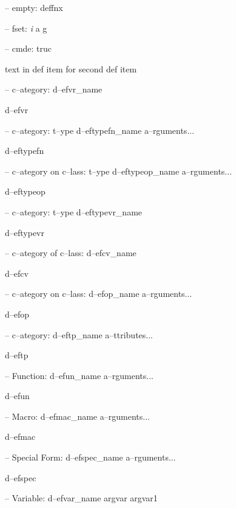 \documentclass{book}
\begin{document}
%
\hbox{}-- empty: deffnx


%

\hbox{}-- fset: \emph{i} a g


%
\hbox{}-- cmde: truc 


%
text in def item for second def item

\hbox{}-- c--ategory: d--efvr\_name


%
d--efvr

\hbox{}-- c--ategory: t--ype d--eftypefn\_name a--rguments...


%
d--eftypefn

\hbox{}-- c--ategory on c--lass: t--ype d--eftypeop\_name a--rguments...


%
d--eftypeop

\hbox{}-- c--ategory: t--ype d--eftypevr\_name


%
d--eftypevr

\hbox{}-- c--ategory of c--lass: d--efcv\_name


%
d--efcv

\hbox{}-- c--ategory on c--lass: d--efop\_name a--rguments...


%
d--efop

\hbox{}-- c--ategory: d--eftp\_name a--ttributes...


%
d--eftp

\hbox{}-- Function: d--efun\_name a--rguments...


%
d--efun

\hbox{}-- Macro: d--efmac\_name a--rguments...


%
d--efmac

\hbox{}-- Special Form: d--efspec\_name a--rguments...


%
d--efspec

\hbox{}-- Variable: d--efvar\_name argvar argvar1
\end{document}
